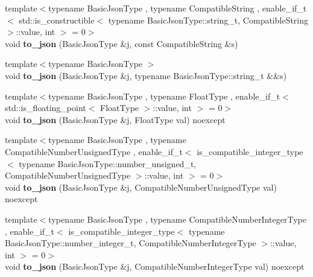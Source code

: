 \begin{DoxyCompactItemize}
\item 
{\footnotesize template$<$typename Basic\+Json\+Type , typename Compatible\+String , enable\+\_\+if\+\_\+t$<$ std\+::is\+\_\+constructible$<$ typename Basic\+Json\+Type\+::string\+\_\+t, Compatible\+String $>$\+::value, int $>$  = 0$>$ }\\void {\bfseries to\+\_\+json} (Basic\+Json\+Type \&j, const Compatible\+String \&s)\hypertarget{namespacenlohmann_1_1detail_a7356ed05cdbbb080cee80e1211e1c6c9}{}\label{namespacenlohmann_1_1detail_a7356ed05cdbbb080cee80e1211e1c6c9}

\item 
{\footnotesize template$<$typename Basic\+Json\+Type $>$ }\\void {\bfseries to\+\_\+json} (Basic\+Json\+Type \&j, typename Basic\+Json\+Type\+::string\+\_\+t \&\&s)\hypertarget{namespacenlohmann_1_1detail_a4aa1ca6b7c61bf19d1f30ea5b669f68e}{}\label{namespacenlohmann_1_1detail_a4aa1ca6b7c61bf19d1f30ea5b669f68e}

\item 
{\footnotesize template$<$typename Basic\+Json\+Type , typename Float\+Type , enable\+\_\+if\+\_\+t$<$ std\+::is\+\_\+floating\+\_\+point$<$ Float\+Type $>$\+::value, int $>$  = 0$>$ }\\void {\bfseries to\+\_\+json} (Basic\+Json\+Type \&j, Float\+Type val) noexcept\hypertarget{namespacenlohmann_1_1detail_a22bffdc8bc7e43af380ba2050696b230}{}\label{namespacenlohmann_1_1detail_a22bffdc8bc7e43af380ba2050696b230}

\item 
{\footnotesize template$<$typename Basic\+Json\+Type , typename Compatible\+Number\+Unsigned\+Type , enable\+\_\+if\+\_\+t$<$ is\+\_\+compatible\+\_\+integer\+\_\+type$<$ typename Basic\+Json\+Type\+::number\+\_\+unsigned\+\_\+t, Compatible\+Number\+Unsigned\+Type $>$\+::value, int $>$  = 0$>$ }\\void {\bfseries to\+\_\+json} (Basic\+Json\+Type \&j, Compatible\+Number\+Unsigned\+Type val) noexcept\hypertarget{namespacenlohmann_1_1detail_ae5fd66b5517b3b5a6c6b9fd9f29ba8dc}{}\label{namespacenlohmann_1_1detail_ae5fd66b5517b3b5a6c6b9fd9f29ba8dc}

\item 
{\footnotesize template$<$typename Basic\+Json\+Type , typename Compatible\+Number\+Integer\+Type , enable\+\_\+if\+\_\+t$<$ is\+\_\+compatible\+\_\+integer\+\_\+type$<$ typename Basic\+Json\+Type\+::number\+\_\+integer\+\_\+t, Compatible\+Number\+Integer\+Type $>$\+::value, int $>$  = 0$>$ }\\void {\bfseries to\+\_\+json} (Basic\+Json\+Type \&j, Compatible\+Number\+Integer\+Type val) noexcept\hypertarget{namespacenlohmann_1_1detail_a91fe576be579c8c2fdd14610605c6dd2}{}\label{namespacenlohmann_1_1detail_a91fe576be579c8c2fdd14610605c6dd2}


\end{DoxyCompactItemize}
